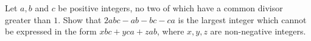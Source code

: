 Let $a,b$ and $c$ be positive integers, no two of which have a common divisor greater than $1$. Show that $2abc-ab-bc-ca$ is the largest integer which cannot be expressed in the form $xbc+yca+zab$,  where $x,y,z$ are non-negative integers.
